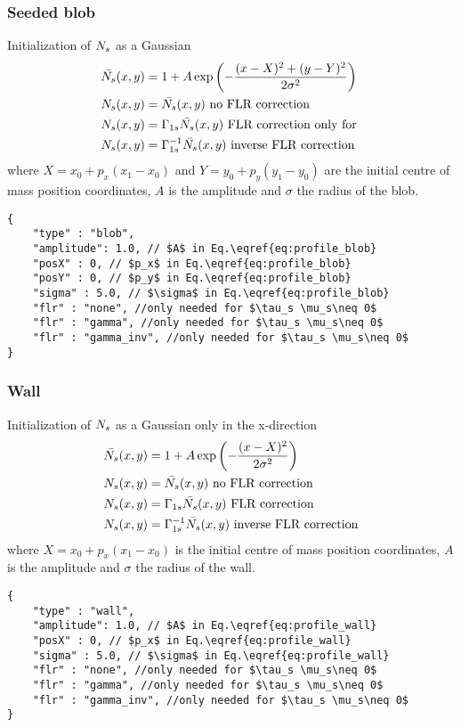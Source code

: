 \subsubsection{Seeded blob}
Initialization of ${N_s} $ as a Gaussian
\begin{align} \label{eq:profile_blob}
    \bar {{N_s} }(x,y) &= 1 + A\exp\left( -\frac{(x-X)^2 + (y-Y)^2}{2\sigma^2}\right) \\
    {N_s} (x,y) &= \bar {{N_s} }(x,y) \text{ no FLR correction} \\
    {N_s} (x,y) &= \Gamma_{1s}\bar {{N_s} }(x,y) \text{ FLR correction only for } \\
    {N_s} (x,y) &= \Gamma_{1s}^{-1}\bar {{N_s} }(x,y) \text{ inverse FLR correction} \\
\end{align}
where $X = x_0 + p_x (x_1 - x_0)$ and $Y= y_0 + p_y( y_1 - y_0)$ are the initial centre of mass position coordinates, $A$ is the amplitude and $\sigma$ the
radius of the blob.
\begin{verbatim}
{
    "type" : "blob",
    "amplitude": 1.0, // $A$ in Eq.\eqref{eq:profile_blob}
    "posX" : 0, // $p_x$ in Eq.\eqref{eq:profile_blob}
    "posY" : 0, // $p_y$ in Eq.\eqref{eq:profile_blob}
    "sigma" : 5.0, // $\sigma$ in Eq.\eqref{eq:profile_blob}
    "flr" : "none", //only needed for $\tau_s \mu_s\neq 0$
    "flr" : "gamma", //only needed for $\tau_s \mu_s\neq 0$
    "flr" : "gamma_inv", //only needed for $\tau_s \mu_s\neq 0$
}
\end{verbatim}
\subsubsection{Wall}
Initialization of ${N_s} $ as a Gaussian only in the x-direction
\begin{align} \label{eq:profile_wall}
    \bar {{N_s} }(x,y) &= 1 + A\exp\left( -\frac{(x-X)^2 }{2\sigma^2}\right) \\
    {N_s} (x,y) &= \bar {{N_s} }(x,y) \text{ no FLR correction} \\
    {N_s} (x,y) &= \Gamma_{1s}\bar {{N_s} }(x,y) \text{ FLR correction} \\
    {N_s} (x,y) &= \Gamma_{1s}^{-1}\bar {{N_s} }(x,y) \text{ inverse FLR correction} \\
\end{align}
where $X = x_0 + p_x (x_1 - x_0)$ is the initial centre of mass position coordinates, $A$ is the amplitude and $\sigma$ the
radius of the wall.
\begin{verbatim}
{
    "type" : "wall",
    "amplitude": 1.0, // $A$ in Eq.\eqref{eq:profile_wall}
    "posX" : 0, // $p_x$ in Eq.\eqref{eq:profile_wall}
    "sigma" : 5.0, // $\sigma$ in Eq.\eqref{eq:profile_wall}
    "flr" : "none", //only needed for $\tau_s \mu_s\neq 0$
    "flr" : "gamma", //only needed for $\tau_s \mu_s\neq 0$
    "flr" : "gamma_inv", //only needed for $\tau_s \mu_s\neq 0$
}
\end{verbatim}


